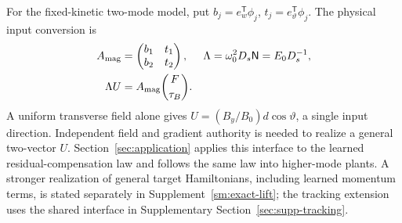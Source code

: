 For the fixed-kinetic two-mode model, put
$b_j=e_w^{\mathsf T}\phi_j$, $t_j=e_\vartheta^{\mathsf T}\phi_j$.
The physical input conversion is
\begin{align}
 A_{\rm mag}&=\begin{pmatrix}b_1&t_1\\b_2&t_2\end{pmatrix},
 &\Lambda&=\omega_0^2D_s\mathsf N=E_0D_s^{-1},\nonumber\\
 \Lambda U&=A_{\rm mag}\binom{F}{\tau_B}.
 \label{mech:modal-ports}
\end{align}
A uniform transverse field alone gives
$U=(B_y/B_0)d\cos\vartheta$, a single input direction. Independent
field and gradient authority is needed to realize a general two-vector
$U$. Section~\ref{sec:application} applies this interface to the learned
residual-compensation law and follows the same law into higher-mode
plants. A stronger realization of general target Hamiltonians,
including learned momentum terms, is stated separately in
Supplement~\ref{sm:exact-lift}; the tracking extension uses the shared
interface in Supplementary Section~\ref{sec:supp-tracking}.
